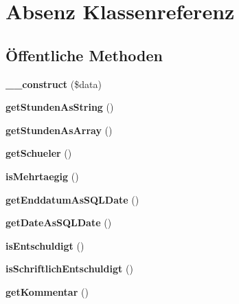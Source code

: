 \hypertarget{class_absenz}{}\section{Absenz Klassenreferenz}
\label{class_absenz}
\subsection*{Öffentliche Methoden}
\begin{DoxyCompactItemize}
\item 
\mbox{\label{class_absenz_aa30af06001d75b57c1c5cfd57dcb4fcd}} 
{\bfseries \+\_\+\+\_\+construct} (\$data)
\item 
\mbox{\label{class_absenz_a615278018297ebdc8aaaa590be8564d0}} 
{\bfseries get\+Stunden\+As\+String} ()
\item 
\mbox{\label{class_absenz_ad406506aff3b62a24a1b59e31495b768}} 
{\bfseries get\+Stunden\+As\+Array} ()
\item 
\mbox{\label{class_absenz_aeebdf1f9468bb29a4b2d86adaa0698ce}} 
{\bfseries get\+Schueler} ()
\item 
\mbox{\label{class_absenz_ac104eb39a45bb064d4efad3cfd3db0cf}} 
{\bfseries is\+Mehrtaegig} ()
\item 
\mbox{\label{class_absenz_ac81385792555705d305c59a0f4584b2b}} 
{\bfseries get\+Enddatum\+As\+S\+Q\+L\+Date} ()
\item 
\mbox{\label{class_absenz_a4d8fb168880cbcf60cd28fc395f0b013}} 
{\bfseries get\+Date\+As\+S\+Q\+L\+Date} ()
\item 
\mbox{\label{class_absenz_aef87d3e4ba06efb1f66cfd728a4f9830}} 
{\bfseries is\+Entschuldigt} ()
\item 
\mbox{\label{class_absenz_aed0a3de4ee14d7cc302f22bce807f460}} 
{\bfseries is\+Schriftlich\+Entschuldigt} ()
\item 
\mbox{\label{class_absenz_ab846cb0bc2dff3117f2862af8fc68649}} 
{\bfseries get\+Kommentar} ()

\end{DoxyCompactItemize}
